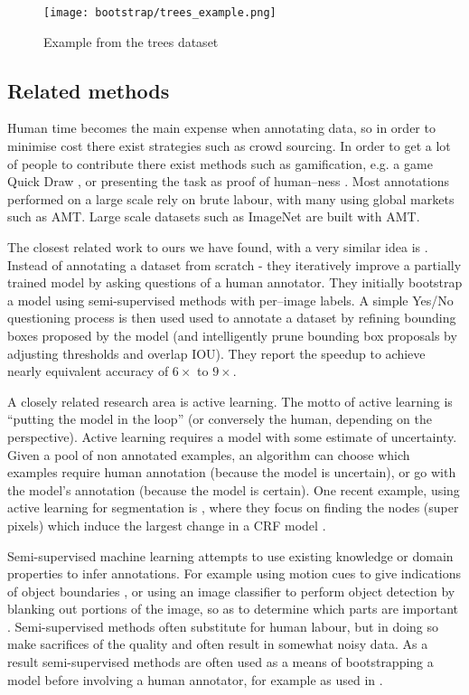\begin{figure}[ht]
\centering
\texttt{[image: bootstrap/trees\_example.png]}

\caption{Example from the trees dataset}
\label{fig:bootstrap_tree}
\end{figure}

\subsection{Related methods}


Human time becomes the main expense when annotating data, so in order to minimise cost there exist strategies such as crowd sourcing. In order to get a lot of people to contribute there exist methods such as gamification, e.g. a game Quick Draw \cite{Ha2017}, or presenting the task as proof of human--ness \cite{Goodfellow2013a}.  Most annotations performed on a large scale rely on brute labour, with many using global markets such as \gls{AMT}. Large scale datasets such as ImageNet \cite{Russakovsky2015} are built with \gls{AMT}. 

The closest related work to ours we have found, with a very similar idea is \cite{Papadopoulos2016}. Instead of annotating a dataset from scratch - they iteratively improve a partially trained model by asking questions of a human annotator. They initially bootstrap a model using semi-supervised methods with per--image labels. A simple Yes/No questioning process is then used used to annotate a dataset by refining bounding boxes proposed by the model (and intelligently prune bounding box proposals by adjusting thresholds and overlap \gls{IOU}). They report the speedup to achieve nearly equivalent accuracy of $6\times$ to $9\times$.

A closely related research area is active learning. The motto of active learning is ``putting the model in the loop'' (or conversely the human, depending on the perspective). Active learning requires a model with some estimate of uncertainty. Given a pool of non annotated examples, an algorithm can choose which examples require human annotation (because the model is uncertain), or go with the model's annotation (because the model is certain). One recent example, using active learning for segmentation is \cite{Xu2017}, where they focus on finding the nodes (super pixels) which induce the largest change in a \gls{CRF} model .

Semi-supervised machine learning attempts to use existing knowledge or domain properties to infer annotations. For example using motion cues to give indications of object boundaries \cite{Hong2017}, or using an image classifier to perform object detection by blanking out portions of the image, so as to determine which parts are important \cite{Bazzani2016}. Semi-supervised methods often substitute for human labour, but in doing so make sacrifices of the quality and often result in somewhat noisy data. As a result semi-supervised methods are often used as a means of bootstrapping a model before involving a human annotator, for example as used in \cite{Papadopoulos2016}.


